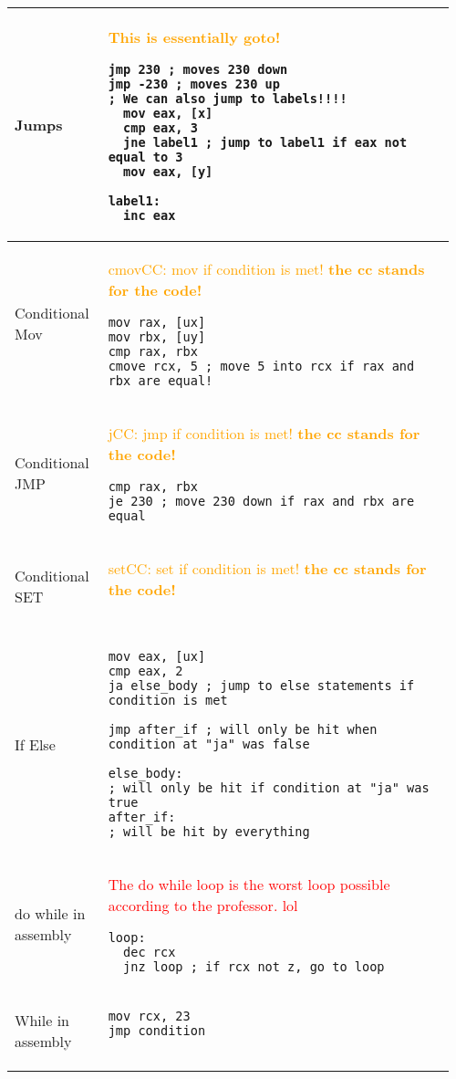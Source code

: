 \documentclass[main.tex,fontsize=8pt,paper=a4,paper=portrait,DIV=calc,]{scrartcl}
\begin{document}
\begin{table}[ht!]
\begin{tabular}{|m{0.2\linewidth}|m{0.755\linewidth}|}
\hline
Jumps & 
\textcolor{orange}{This is essentially goto!}\newline
\begin{lstlisting}
jmp 230 ; moves 230 down 
jmp -230 ; moves 230 up
; We can also jump to labels!!!!
  mov eax, [x]
  cmp eax, 3
  jne label1 ; jump to label1 if eax not equal to 3
  mov eax, [y]
  
label1: 
  inc eax
\end{lstlisting}\\
\hline
Conditional Mov & 
\textcolor{orange}{cmovCC: mov if condition is met! \textbf{the cc stands for the code!}}\newline
\begin{lstlisting}
mov rax, [ux]
mov rbx, [uy]
cmp rax, rbx
cmove rcx, 5 ; move 5 into rcx if rax and rbx are equal!
\end{lstlisting}\\
\hline
Conditional JMP & 
\textcolor{orange}{jCC: jmp if condition is met! \textbf{the cc stands for the code!}}\newline
\begin{lstlisting}
cmp rax, rbx
je 230 ; move 230 down if rax and rbx are equal
\end{lstlisting}\\
\hline
Conditional SET &
\textcolor{orange}{setCC: set if condition is met! \textbf{the cc stands for the code!}}\newline
\begin{lstlisting}

\end{lstlisting}\\
\hline
If Else & 
\begin{lstlisting}
mov eax, [ux]
cmp eax, 2 
ja else_body ; jump to else statements if condition is met

jmp after_if ; will only be hit when condition at "ja" was false

else_body: 
; will only be hit if condition at "ja" was true
after_if:
; will be hit by everything
\end{lstlisting}\\
\hline
do while in assembly & 
\textcolor{red}{The do while loop is the worst loop possible according to the professor. lol}\newline
\begin{lstlisting}
loop: 
  dec rcx
  jnz loop ; if rcx not z, go to loop
\end{lstlisting}\\
\hline
While in assembly & 
\begin{lstlisting}
mov rcx, 23 
jmp condition 


\end{lstlisting}
\end{tabular}
\end{table}
\end{document}
